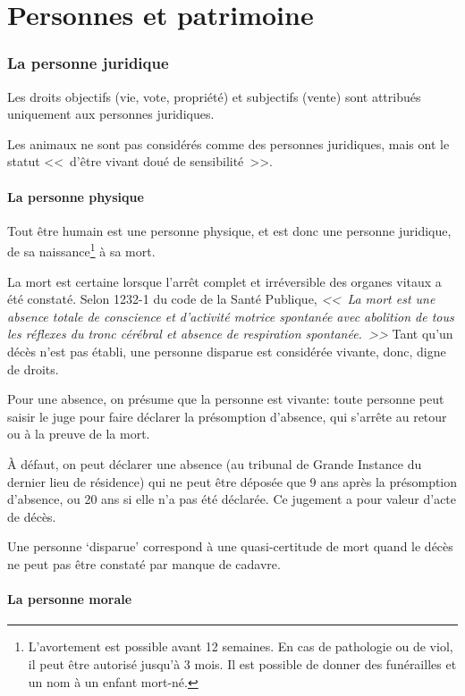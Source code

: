 \documentclass[10pt,a4paper]{article}
\begin{document}
\part{Personnes et patrimoine}

\section{La personne juridique}

Les droits objectifs (vie, vote, propriété) et subjectifs (vente) sont attribués uniquement aux personnes juridiques.

Les animaux ne sont pas considérés comme des personnes juridiques, mais ont le statut <<~d'être vivant doué de sensibilité~>>.

\subsection{La personne physique}

Tout être humain est une personne physique, et est donc une personne juridique, de sa naissance\footnote{L'avortement est possible avant 12 semaines. En cas de pathologie ou de viol, il peut être autorisé jusqu'à 3 mois. Il est possible de donner des funérailles et un nom à un enfant mort-né.} à sa mort.

La mort est certaine lorsque l'arrêt complet et irréversible des organes vitaux a été constaté. Selon 1232-1 du code de la Santé Publique, \textit{<<~La mort est une absence totale de conscience et d'activité motrice spontanée avec abolition de tous les réflexes du tronc cérébral et absence de respiration spontanée.~>>} Tant qu'un décès n'est pas établi, une personne disparue est considérée vivante, donc, digne de droits.

Pour une absence, on présume que la personne est vivante: toute personne peut saisir le juge pour faire déclarer la présomption d'absence, qui s'arrête au retour ou à la preuve de la mort.

À défaut, on peut déclarer une absence (au tribunal de Grande Instance du dernier lieu de résidence) qui ne peut être déposée que 9 ans après la présomption d'absence, ou 20 ans si elle n'a pas été déclarée. Ce jugement a pour valeur d'acte de décès.

Une personne `disparue' correspond à une quasi-certitude de mort quand le décès ne peut pas être constaté par manque de cadavre.

\subsection{La personne morale}
\end{document}
